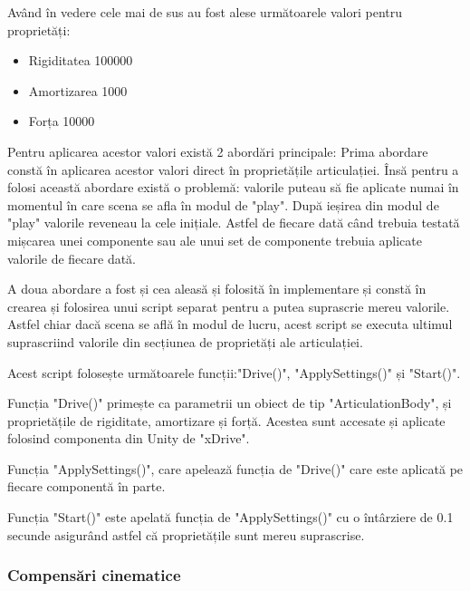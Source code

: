 Având în vedere cele mai de sus au fost alese următoarele valori pentru proprietăți:
\begin{itemize}
	\item Rigiditatea 100000
	\item Amortizarea 1000
	\item Forța 10000
\end{itemize}

Pentru aplicarea acestor valori există 2 abordări principale:
Prima abordare constă în aplicarea  acestor valori direct în proprietățile articulației. Însă pentru a folosi această abordare există o problemă: valorile puteau să fie aplicate numai în momentul în care scena se afla în modul de "play". După ieșirea  din modul de "play" valorile reveneau la cele inițiale. Astfel de fiecare dată când trebuia testată mișcarea unei componente sau ale unui set de componente trebuia aplicate valorile de fiecare dată.

A doua abordare a fost și cea aleasă și folosită în implementare și constă în crearea  și folosirea unui script separat pentru a putea suprascrie mereu valorile. Astfel chiar dacă scena se află în modul de lucru, acest script se executa ultimul suprascriind valorile din secțiunea de proprietăți ale articulației. 

Acest script folosește următoarele funcții:"Drive()", "ApplySettings()" și "Start()".

Funcția "Drive()"  primește ca parametrii un obiect de tip "ArticulationBody", și proprietățile de rigiditate, amortizare și forță. Acestea sunt accesate și aplicate folosind componenta din Unity de "xDrive".

Funcția  "ApplySettings()", care apelează funcția de "Drive()" care este aplicată pe fiecare componentă în parte.

Funcția "Start()" este apelată funcția de "ApplySettings()" cu o întârziere de 0.1 secunde asigurând astfel că proprietățile sunt mereu suprascrise.


\subsubsection{Compensări cinematice}

